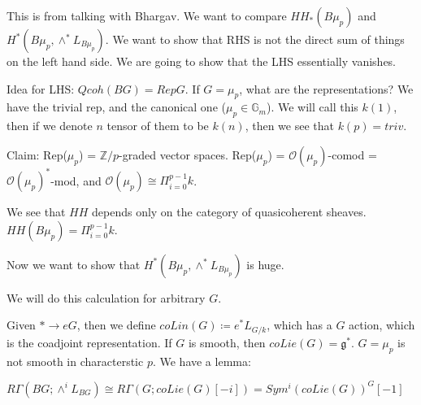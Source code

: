 \documentclass[../main.tex]{subfiles}
\begin{document}
\begin{remark}[Sam]
This is from talking with Bhargav. We want to compare $HH_*(B\mu_p)$ and $H^*(B\mu_p, \wedge^*L_{B\mu_p})$. We want to show that RHS is not the direct sum of things on the left hand side. We are going to show that the LHS essentially vanishes. 

Idea for LHS: $Qcoh(BG) = Rep G$. If $G = \mu_p$, what are the representations? We have the trivial rep, and the canonical one ($\mu_p \in \mathbb{G}_m$). We will call this $k(1)$, then if we denote $n$ tensor of them to be $k(n)$, then we see that $k(p) = triv$. 

Claim: Rep($\mu_p$) = $\mathbb{Z}/p$-graded vector spaces.
Rep($\mu_p$) = $\mathcal{O}(\mu_p)$-comod = $\mathcal{O}(\mu_p)^{*}$-mod, and $\mathcal{O}(\mu_p) \cong \Pi^{p-1}_{i=0} k$. 

We see that $HH$ depends only on the category of quasicoherent sheaves. $HH(B\mu_p) = \Pi^{p-1}_{i=0} k$.

\end{remark}

Now we want to show that $H^*(B\mu_p, \wedge^*L_{B\mu_p})$ is huge.

We will do this calculation for arbitrary $G$.

Given $*\rightarrow{e} G$, then we define $coLin(G) \coloneqq e^*L_{G/k}$, which has a $G$ action, which is the coadjoint representation. If $G$ is smooth, then $coLie(G) = \mathfrak{g}^*$. $G = \mu_p$ is not smooth in characterstic $p$. We have a lemma:

\begin{lemma}
$R\Gamma(BG; \wedge^iL_{BG}) \cong R\Gamma(G;coLie(G)[-i]) = Sym^i(coLie(G))^G[-1]$
\end{lemma}
\end{document}

